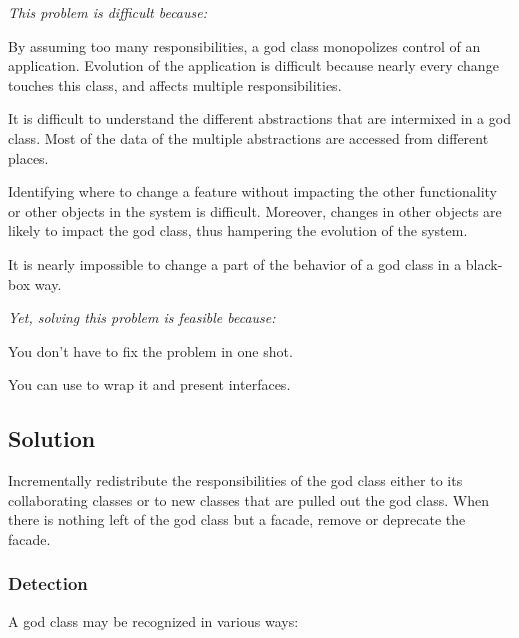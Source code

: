 \documentclass[a4paper,10pt,twoside]{book}
\begin{document}
\emph{This problem is difficult because:} 

\begin{bulletlist}
\item By assuming too many responsibilities, a god class monopolizes control of an application. Evolution of the application is difficult because nearly every change touches this class, and affects multiple responsibilities.

\item It is difficult to understand the different abstractions that are intermixed in a god class. Most of the data of the multiple abstractions are accessed from different places.

\item Identifying where to change a feature without impacting the other functionality or other objects in the system is difficult. Moreover, changes in other objects are likely to impact the god class, thus hampering the evolution of the system. 

\item It is nearly impossible to change a part of the behavior of a god class in a black-box way.
\end{bulletlist}

\emph{Yet, solving this problem is feasible because:}

\begin{bulletlist}
\item You don't have to fix the problem in one shot.

\item You can use  to wrap it and present interfaces.
\end{bulletlist}

\subsection*{Solution}

Incrementally redistribute the responsibilities of the god class either to its collaborating classes or to new classes that are pulled out the god class. When there is nothing left of the god class but a facade, remove or deprecate the facade.

\subsubsection*{Detection}

A god class may be recognized in various ways:
\end{document}
